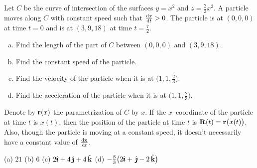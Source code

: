 \begin{question}[M317 1999A] %
 Let $C$ be the curve of intersection of
the surfaces $y=x^2$ and $z=\frac{2}{3}x^3$.
A particle moves along $C$ with constant speed such that $\diff{x}{t}>0$.
The particle is at $(0,0,0)$ at time $t=0$ and is at $(3,9,18)$ at time
$t=\frac{7}{2}$.
\begin{enumerate}[(a)]
\item
Find the length of the part of $C$ between $(0,0,0)$ and $(3,9,18)$.
\item
Find the constant speed of the particle.
\item
Find the velocity of the particle when it is at $\big(1,1,\frac{2}{3}\big)$.
\item
Find the acceleration of the particle when it is at $\big(1,1,\frac{2}{3}\big)$.
\end{enumerate}
\end{question}

\begin{hint} 
Denote by $\mathbf{r}(x)$ the parametrization of $C$ by $x$. If the $x$--coordinate
of the particle at time $t$ is $x(t)$, then the position of the particle at time $t$ is $\mathbf{R}(t)=\mathbf{r}\big(x(t)\big)$. Also, though the particle is moving at a constant speed, it doesn't necessarily have a constant value of $\diff{\vx}{t}$.
\end{hint}

\begin{answer} 
(a) $21$\qquad
(b) $6$\qquad
(c) $2\hat{\pmb{\imath}}+4\,\hat{\pmb{\jmath}}+4\,\hat{\mathbf{k}}$\qquad
(d) $-\frac{8}{3}\big(2\hat{\pmb{\imath}}+\,\hat{\pmb{\jmath}}-2\,\hat{\mathbf{k}}\big)$
\end{answer}

